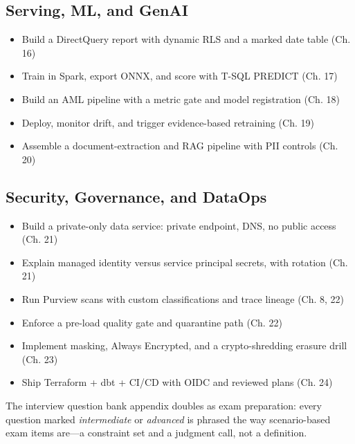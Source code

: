 \subsection*{Serving, ML, and GenAI}
\begin{itemize}
    \item[$\square$] Build a DirectQuery report with dynamic RLS and a marked date table (Ch. 16)
    \item[$\square$] Train in Spark, export ONNX, and score with T-SQL PREDICT (Ch. 17)
    \item[$\square$] Build an AML pipeline with a metric gate and model registration (Ch. 18)
    \item[$\square$] Deploy, monitor drift, and trigger evidence-based retraining (Ch. 19)
    \item[$\square$] Assemble a document-extraction and RAG pipeline with PII controls (Ch. 20)
\end{itemize}

\subsection*{Security, Governance, and DataOps}
\begin{itemize}
    \item[$\square$] Build a private-only data service: private endpoint, DNS, no public access (Ch. 21)
    \item[$\square$] Explain managed identity versus service principal secrets, with rotation (Ch. 21)
    \item[$\square$] Run Purview scans with custom classifications and trace lineage (Ch. 8, 22)
    \item[$\square$] Enforce a pre-load quality gate and quarantine path (Ch. 22)
    \item[$\square$] Implement masking, Always Encrypted, and a crypto-shredding erasure drill (Ch. 23)
    \item[$\square$] Ship Terraform + dbt + CI/CD with OIDC and reviewed plans (Ch. 24)
\end{itemize}

\begin{tipbox}
The interview question bank appendix doubles as exam preparation: every question marked
\emph{intermediate} or \emph{advanced} is phrased the way scenario-based exam items are---a
constraint set and a judgment call, not a definition.
\end{tipbox}
